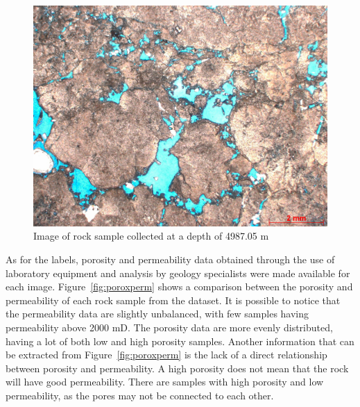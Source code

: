 \documentclass[a4paper,fleqn]{cas-sc}
\begin{document}
\begin{figure}[h!]
	\caption{Image of rock sample collected at a depth of 4987.05 m}
	\label{fig:rocha-4987,05}
	\centering%
	\begin{minipage}{0.5\textwidth}
		\includegraphics[width=\textwidth]{images/3-SPS-69_T01_4987,05_1,25x.jpg}
	\end{minipage}
\end{figure}


As for the labels, porosity and permeability data obtained through the use of laboratory equipment and analysis by geology specialists were made available for each image. Figure~\ref{fig:poroxperm} shows a comparison between the porosity and permeability of each rock sample from the dataset. It is possible to notice that the permeability data are slightly unbalanced, with few samples having permeability above 2000 mD. The porosity data are more evenly distributed, having a lot of both low and high porosity samples. Another information that can be extracted from Figure~\ref{fig:poroxperm} is the lack of a direct relationship between porosity and permeability. A high porosity does not mean that the rock will have good permeability. There are samples with high porosity and low permeability, as the pores may not be connected to each other.
\end{document}
